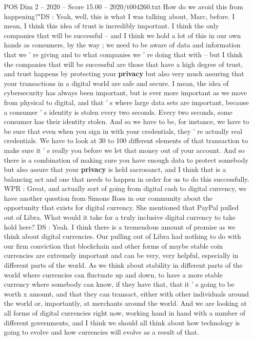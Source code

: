 \begin{textsample}{POS Dim 2 – 2020 – Score 15.00 – 2020/t004260.txt}
How do we avoid this from happening?"DS : Yeah, well, this is what I was talking about, Marc, before.
I mean, I think this idea of trust is incredibly important.
I think the only companies that will be successful -- and I think we hold a lot of this in our own hands as consumers, by the way ; we need to be aware of data and information that we ' re giving and to what companies we ' re doing that with -- but I think the companies that will be successful are those that have a high degree of trust, and trust happens by protecting your \textbf{privacy} but also very much assuring that your transactions in a digital world are safe and secure.
I mean, the idea of cybersecurity has always been important, but is ever more important as we move from physical to digital, and that ' s where large data sets are important, because a consumer ' s identity is stolen every two seconds.
Every two seconds, some consumer has their identity stolen.
And so we have to be, for instance, we have to be sure that even when you sign in with your credentials, they ' re actually real credentials.
We have to look at 30 to 100 different elements of that transaction to make sure it ' s really you before we let that money out of your account.
And so there is a combination of making sure you have enough data to protect somebody but also assure that your \textbf{privacy} is held sacrosanct, and I think that is a balancing act and one that needs to happen in order for us to do this successfully.
WPR : Great, and actually sort of going from digital cash to digital currency, we have another question from Simone Ross in our community about the opportunity that exists for digital currency.
She mentioned that PayPal pulled out of Libra.
What would it take for a truly inclusive digital currency to take hold here?
DS : Yeah.
I think there is a tremendous amount of promise as we think about digital currencies.
Our pulling out of Libra had nothing to do with our firm conviction that blockchain and other forms of maybe stable coin currencies are extremely important and can be very, very helpful, especially in different parts of the world.
As we think about stability in different parts of the world where currencies can fluctuate up and down, to have a more stable currency where somebody can know, if they have that, that it ' s going to be worth x amount, and that they can transact, either with other individuals around the world or, importantly, at merchants around the world.
And we are looking at all forms of digital currencies right now, working hand in hand with a number of different governments, and I think we should all think about how technology is going to evolve and how currencies will evolve as a result of that.

\end{textsample}
